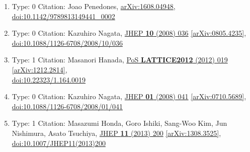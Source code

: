 \documentclass[a4paper,10pt]{article}
\begin{document}
\begin{enumerate}
\begin{enumerate}
  \item Type: 0 Citation: Joao Penedones, \href{https://arxiv.org/abs/1608.04948}{arXiv:1608.04948},\\\href{https://www.doi.org/10.1142/9789813149441_0002}{doi:10.1142/9789813149441\_0002}
  \item Type: 0 Citation: Kazuhiro Nagata, \href{https://www.doi.org/10.1088/1126-6708/2008/10/036}{JHEP {\bf 10} (2008) 036}  \href{https://arxiv.org/abs/0805.4235}{[arXiv:0805.4235]},\\\href{https://www.doi.org/10.1088/1126-6708/2008/10/036}{doi:10.1088/1126-6708/2008/10/036}
  \item Type: 1 Citation: Masanori Hanada, \href{https://www.doi.org/10.22323/1.164.0019}{PoS {\bf LATTICE2012} (2012) 019}  \href{https://arxiv.org/abs/1212.2814}{[arXiv:1212.2814]},\\\href{https://www.doi.org/10.22323/1.164.0019}{doi:10.22323/1.164.0019}
  \item Type: 0 Citation: Kazuhiro Nagata, \href{https://www.doi.org/10.1088/1126-6708/2008/01/041}{JHEP {\bf 01} (2008) 041}  \href{https://arxiv.org/abs/0710.5689}{[arXiv:0710.5689]},\\\href{https://www.doi.org/10.1088/1126-6708/2008/01/041}{doi:10.1088/1126-6708/2008/01/041}
  \item Type: 1 Citation: Masazumi Honda, Goro Ishiki, Sang-Woo Kim, Jun Nishimura, Asato Tsuchiya, \href{https://www.doi.org/10.1007/JHEP11(2013)200}{JHEP {\bf 11} (2013) 200}  \href{https://arxiv.org/abs/1308.3525}{[arXiv:1308.3525]},\\\href{https://www.doi.org/10.1007/JHEP11(2013)200}{doi:10.1007/JHEP11(2013)200}

\end{enumerate}
\end{enumerate}
\end{document}
